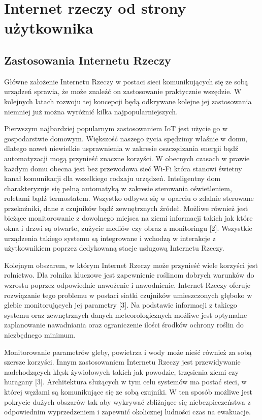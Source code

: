 \documentclass[12pt, twoside, openany]{mwrep}
\begin{document}
\chapter{Internet rzeczy od strony użytkownika}

\section{Zastosowania Internetu Rzeczy}

Główne założenie Internetu Rzeczy w postaci sieci komunikujących się ze sobą urządzeń sprawia, że może znaleźć on zastosowanie praktycznie wszędzie. W kolejnych latach rozwoju tej koncepcji będą odkrywane kolejne jej zastosowania niemniej już można wyróżnić kilka najpopularniejszych.
\par
Pierwszym najbardziej popularnym zastosowaniem IoT jest użycie go w gospodarstwie domowym.  Większość naszego życia spędzimy właśnie w domu, dlatego nawet niewielkie usprawnienia w zakresie oszczędzania energii bądź automatyzacji mogą przynieść znaczne korzyści. W obecnych czasach w prawie każdym domu obecna jest bez przewodowa sieć Wi-Fi która stanowi świetny kanał komunikacji dla wszelkiego rodzaju urządzeń. Inteligentny dom charakteryzuje się pełną automatyką w zakresie sterowania oświetleniem, roletami bądź termostatem. Wszystko odbywa się w oparciu o zdalnie sterowane przekaźniki, dane z czujników bądź zewnętrznych źródeł. Możliwe również jest bieżące monitorowanie z dowolnego miejsca na ziemi informacji takich jak które okna i drzwi są otwarte, zużycie mediów czy obraz z monitoringu [2]. Wszystkie urządzenia takiego systemu są integrowane i wchodzą w interakcje z użytkownikiem poprzez dedykowaną stacje usługową Internetu Rzeczy.
\par
Kolejnym obszarem, w którym Internet Rzeczy może przynieść wiele korzyści jest rolnictwo. Dla rolnika kluczowe jest zapewnienie roślinom dobrych warunków do wzrostu poprzez odpowiednie nawożenie i nawodnienie. Internet Rzeczy oferuje rozwiązanie tego problemu w postaci siatki czujników umieszczonych głęboko w glebie monitorujących jej parametry [3]. Na podstawie informacji z takiego systemu oraz zewnętrznych danych meteorologicznych możliwe jest optymalne zaplanowanie nawadniania oraz ograniczenie ilości środków ochrony roślin do niezbędnego minimum.
\par
Monitorowanie parametrów gleby, powietrza i wody może nieść również za sobą szersze korzyści. Innym zastosowaniem Internetu Rzeczy jest przewidywanie nadchodzących klęsk żywiołowych takich jak powodzie, trzęsienia ziemi czy huragany [3]. Architektura służących w tym celu systemów ma postać sieci, w której węzłami są komunikujące się ze sobą czujniki. W ten sposób możliwe jest pokrycie dużych obszarów tak aby wykrywać zbliżające się niebezpieczeństwa z odpowiednim wyprzedzeniem i zapewnić okolicznej ludności czas na ewakuacje.
\end{document}
